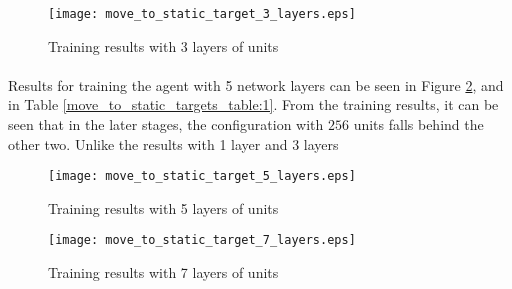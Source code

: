 \begin{figure}
    \begin{center}
        \texttt{[image: move\_to\_static\_target\_3\_layers.eps]}
        \caption{Training results with 3 layers of units}
        \label{train_results_static_3_layers}
    \end{center}
\end{figure}


\paragraph{}
Results for training the agent with 5 network layers can be seen in Figure \ref{train_results_static_5_layers}, and in Table \ref{move_to_static_targets_table:1}. From the training results, it can be seen that in the later stages, the configuration with $256$ units falls behind the other two. Unlike the results with 1 layer and 3 layers

\begin{figure}
    \begin{center}
        \texttt{[image: move\_to\_static\_target\_5\_layers.eps]}
        \caption{Training results with 5 layers of units}
        \label{train_results_static_5_layers}
    \end{center}
\end{figure}

\begin{figure}
    \begin{center}
        \texttt{[image: move\_to\_static\_target\_7\_layers.eps]}
        \caption{Training results with 7 layers of units}
        \label{train_results_static_7_layers}
    \end{center}
\end{figure}


